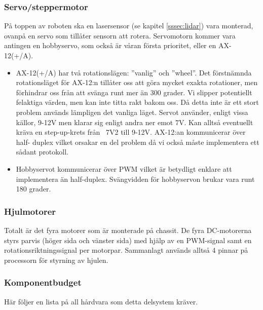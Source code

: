 \documentclass[a4paper,11pt]{article}
\begin{document}
\subsubsection{Servo/steppermotor} \label{ssec:servomotor}
På toppen av roboten ska en lasersensor (se kapitel \ref{sssec:lidar}) vara monterad, ovanpå en servo som tillåter sensorn att rotera. Servomotorn kommer vara antingen en hobbyservo, som också är våran första prioritet, eller en AX-12(+/A).

\begin{itemize}
\item AX-12(+/A) har två rotationslägen: ''vanlig'' och ''wheel''. Det förstnämnda rotationsläget för AX-12:n tillåter oss att göra mycket exakta rotationer, men förhindrar oss från att svänga runt mer än 300 grader. Vi slipper potentiellt felaktiga värden, men kan inte titta rakt bakom oss. Då detta inte är ett stort problem används lämpligen det vanliga läget. Servot använder, enligt vissa källor, 9-12V men klarar sig enligt andra ner emot 7V. Kan alltså eventuellt kräva en step-up-krets från ~7V2 till 9-12V. AX-12:an kommunicerar över half- duplex vilket orsakar en del problem då vi också måste implementera ett sådant protokoll.

\item Hobbyservot kommunicerar över PWM vilket är betydligt enklare att implementera än half-duplex. Svängvidden för hobbyservon brukar vara runt 180 grader.
\end{itemize}

\subsubsection{Hjulmotorer}
Totalt är det fyra motorer som är monterade på chassit. De fyra DC-motorerna styrs parvis (höger sida och vänster sida) med hjälp av en PWM-signal samt en rotationsriktningssignal per motorpar. Sammanlagt används alltså 4 pinnar på processorn för styrning av hjulen.

\subsubsection{Komponentbudget}
Här följer en lista på all hårdvara som detta delsystem kräver.

\begin{HardwareList}
\end{HardwareList}
\end{document}
